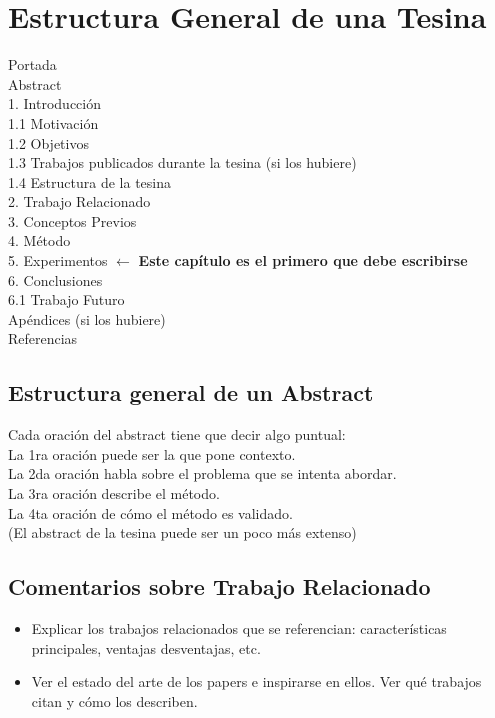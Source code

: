 \documentclass[a4paper,	11pt]{article}
\begin{document}
\section{Estructura General de una Tesina}
Portada\\
Abstract\\
1. Introducción\\
1.1 Motivación\\
1.2 Objetivos\\
1.3 Trabajos publicados durante la tesina (si los hubiere)\\
1.4 Estructura de la tesina\\
2. Trabajo Relacionado\\
3. Conceptos Previos\\
4. Método\\
5. Experimentos $\leftarrow$ \textbf{Este capítulo es el primero que debe escribirse}\\
6. Conclusiones\\
6.1 Trabajo Futuro\\
Apéndices (si los hubiere)\\
Referencias

\subsection{Estructura general de un Abstract}
Cada oración del abstract tiene que decir algo puntual:\\
La 1ra oración puede ser la que pone contexto.\\
La 2da oración habla sobre el problema que se intenta abordar.\\
La 3ra oración describe el método.\\
La 4ta oración de cómo el método es validado.\\
(El abstract de la tesina puede ser un poco más extenso)


\subsection{Comentarios sobre Trabajo Relacionado}
\begin{itemize}
    \item Explicar los trabajos relacionados que se referencian: características principales, ventajas desventajas, etc.
    \item Ver el estado del arte de los papers e inspirarse en ellos. Ver qué trabajos citan y cómo los describen.
\end{itemize}
\end{document}
